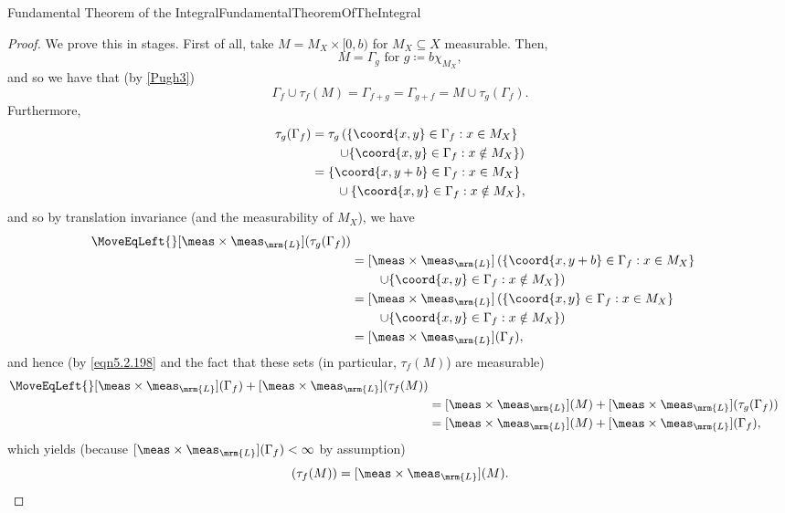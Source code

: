 \begin{thm}{Fundamental Theorem of the Integral}{FundamentalTheoremOfTheIntegral}
\begin{proof}
We prove this in stages.  First of all, take $M=M_X\times [0,b)$ for $M_X\subseteq X$ measurable.  Then,
\begin{equation}
M=\Gamma _g\text{ for }g\coloneqq b\chi _{M_X},
\end{equation}
and so we have that (by \eqref{Pugh3})
\begin{equation}\label{eqn5.2.198}
\Gamma _f\cup \tau _f(M)=\Gamma _{f+g}=\Gamma _{g+f}=M\cup \tau _g(\Gamma _f).
\end{equation}
Furthermore,
\begin{equation}
\begin{split}
\tau _g(\Gamma _f) & =\tau _g\left( \{ \coord{x,y}\in \Gamma _f:x\in M_X\} \right. \\ & \qquad \left. \cup \{ \coord{x,y}\in \Gamma _f:x\notin M_X\} \right) \\
& =\{ \coord{x,y+b}\in \Gamma _f:x\in M_X\} \\ & \qquad \cup \{ \coord{x,y}\in \Gamma _f:x\notin M_X\} ,
\end{split}
\end{equation}
and so by translation invariance (and the measurability of $M_X$), we have
\begin{equation}
\begin{split}
\MoveEqLeft {}
[\meas \times \meas _{\mrm{L}}](\tau _g(\Gamma _f)) \\
& =[\meas \times \meas _{\mrm{L}}]\left( \{ \coord{x,y+b}\in \Gamma _f:x\in M_X\} \right. \\ & \qquad \left. \cup \{ \coord{x,y}\in \Gamma _f:x\notin M_X\} \right) \\
& =[\meas \times \meas _{\mrm{L}}]\left( \{ \coord{x,y}\in \Gamma _f:x\in M_X\} \right. \\ & \qquad \left. \cup \{ \coord{x,y}\in \Gamma _f:x\notin M_X\} \right) \\
& =[\meas \times \meas _{\mrm{L}}](\Gamma _f),
\end{split}
\end{equation}
and hence (by \eqref{eqn5.2.198} and the fact that these sets (in particular, $\tau _f(M)$) are measurable)
\begin{equation}
\begin{split}
\MoveEqLeft {}
[\meas \times \meas _{\mrm{L}}](\Gamma _f)+[\meas \times \meas _{\mrm{L}}](\tau _f(M)) \\
& =[\meas \times \meas _{\mrm{L}}](M)+[\meas \times \meas _{\mrm{L}}](\tau _g(\Gamma _f)) \\
& =[\meas \times \meas _{\mrm{L}}](M)+[\meas \times \meas _{\mrm{L}}](\Gamma _f),
\end{split}
\end{equation}
which yields (because $[\meas \times \meas _{\mrm{L}}](\Gamma _f)<\infty$ by assumption)
\begin{equation}
[\meas \times \meas _{\mrm{L}}](\tau _f(M))=[\meas \times \meas _{\mrm{L}}](M).
\end{equation}


\end{proof}
\end{thm}
